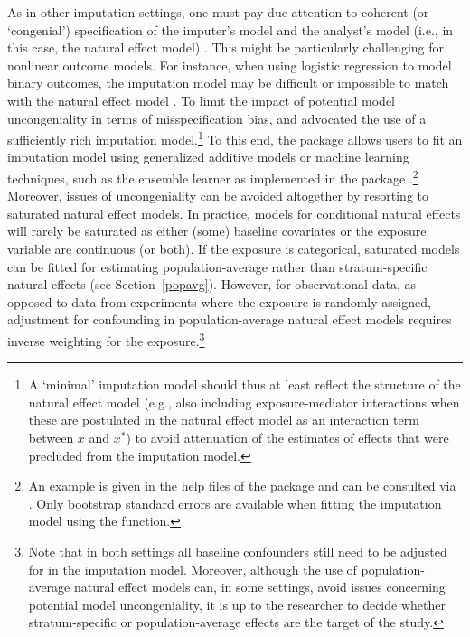 \documentclass[nojss]{jss}
\begin{document}
\par As in other imputation settings, one must pay due attention to coherent (or `congenial') specification of the imputer's model and the analyst's model (i.e., in this case, the natural effect model) \citep{Meng1994}. This might be particularly challenging for nonlinear outcome models. For instance, when using logistic regression to model binary outcomes, the imputation model may be difficult or impossible to match with the natural effect model \citep{VanderWeele2010, TchetgenTchetgen2014}. To limit the impact of potential model uncongeniality in terms of misspecification bias, \cite{Vansteelandt2012} and \cite{Loeys2013a} advocated the use of a sufficiently rich imputation model.\footnote{A `minimal' imputation model should thus at least reflect the structure of the natural effect model (e.g., also including exposure-mediator interactions when these are postulated in the natural effect model as an interaction term between $x$ and $x^*$) to avoid attenuation of the estimates of effects that were precluded from the imputation model.} To this end, the  package allows users to fit an imputation model using generalized additive models or machine learning techniques, such as the ensemble learner as implemented in the  package \citep{R:SuperLearner}.\footnote{An example is given in the help files of the package and can be consulted via . Only bootstrap standard errors are available when fitting the imputation model using the  function.} Moreover, issues of uncongeniality can be avoided altogether by resorting to saturated natural effect models. In practice, models for conditional natural effects will rarely be saturated as either (some) baseline covariates or the exposure variable are continuous (or both). If the exposure is categorical, saturated models can be fitted for estimating population-average rather than stratum-specific natural effects (see Section~\ref{popavg}). However, for observational data, as opposed to data from experiments where the exposure is randomly assigned, adjustment for confounding in population-average natural effect models requires inverse weighting for the exposure.\footnote{Note that in both settings all baseline confounders still need to be adjusted for in the imputation model. Moreover, although the use of population-average natural effect models can, in some settings, avoid issues concerning potential model uncongeniality, it is up to the researcher to decide whether stratum-specific or population-average effects are the target of the study.}
\end{document}
